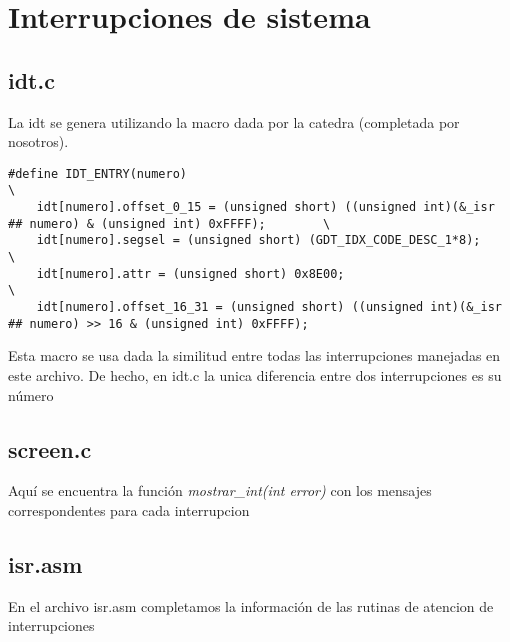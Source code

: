 
\section{Interrupciones de sistema}
\subsection{idt.c}
La idt se genera utilizando la macro dada por la catedra (completada por nosotros).
\begin{codesnippet}
\begin{verbatim}
#define IDT_ENTRY(numero)                                                                                        \
    idt[numero].offset_0_15 = (unsigned short) ((unsigned int)(&_isr ## numero) & (unsigned int) 0xFFFF);        \
    idt[numero].segsel = (unsigned short) (GDT_IDX_CODE_DESC_1*8);                                                                  \
    idt[numero].attr = (unsigned short) 0x8E00;                                                                  \
    idt[numero].offset_16_31 = (unsigned short) ((unsigned int)(&_isr ## numero) >> 16 & (unsigned int) 0xFFFF);
\end{verbatim}
\end{codesnippet}

Esta macro se usa dada la similitud entre todas las interrupciones manejadas en este archivo. De hecho, en idt.c la unica diferencia 
entre dos interrupciones es su n\'umero
\subsection{screen.c}
Aqu\'i se encuentra la funci\'on \textit{mostrar_int(int error)} con los mensajes correspondentes para cada interrupcion
\subsection{isr.asm}

En el archivo isr.asm completamos la informaci\'on de las rutinas de atencion de interrupciones
